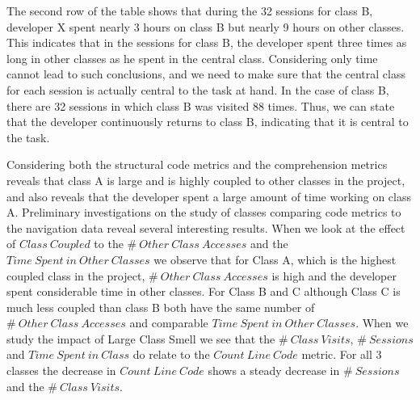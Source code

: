 The second row of the table shows that during the 32 sessions for class B, developer X spent nearly 3 hours on class B but nearly 9 hours on other classes. This indicates that in the sessions for class B, the developer spent three times as long in other classes as he spent in the central class. Considering only time cannot lead to such conclusions, and we need to make sure that the central class for each session is actually central to the task at hand. In the case of class B, there are 32 sessions in which class B was visited 88 times. Thus, we can state that the developer continuously returns to class B, indicating that it is central to the task. 


Considering both the structural code metrics and the comprehension metrics reveals that class A is large and is highly coupled to other classes in the project, and also reveals that the developer spent a large amount of time working on class A. Preliminary investigations on the study of classes comparing code metrics to the navigation data reveal several interesting results. When we look at the effect of  $Class~Coupled$ to the  $\#~Other~Class~Accesses$ and the $Time~Spent~in~Other~Classes$ we observe that for Class A, which is the highest coupled class in the project, $\#~Other~Class~Accesses$ is high and the developer spent considerable time in other classes. For Class B and C although Class C is much less coupled than class B both have the same number of  $\#~Other~Class~Accesses$ and comparable $Time~Spent~in~Other~Classes$. When we study the impact of Large Class Smell we see that the $\#~Class~Visits$, $\#~Sessions$ and $Time~Spent~in~Class$ do relate to the $Count~Line~Code$ metric. For all 3 classes the decrease in $Count~Line~Code$ shows a steady decrease in $\#~Sessions$ and the $\#~Class~Visits$. 

